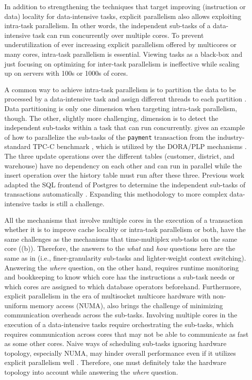 \documentclass[11pt]{article}
\begin{document}
In addition to strengthening the techniques that
target improving (instruction or data) locality for data-intensive tasks,
explicit parallelism also allows exploiting intra-task parallelism.
In other words, 
the independent sub-tasks of a data-intensive task can run concurrently over multiple cores.
To prevent underutilization of ever increasing explicit parallelism offered by multicores or many cores,
intra-task parallelism is essential.
Viewing tasks as a black-box and just focusing on optimizing for inter-task parallelism
is ineffective while scaling up on servers with 100s or 1000s of cores.

A common way to achieve intra-task parallelism is to partition the data to be processed
by a data-intensive task and assign different threads to each partition \cite{LeisBKN14, PsaroudakisSMSA15}.
Data partitioning is only one dimension when targeting intra-task parallelism, though.
The other, slightly more challenging, dimension is to detect the independent sub-tasks
within a task that can run concurrently. 
 gives an example of how to parallelize the sub-tasks of the
\texttt{payment} transaction from the industry-standard TPC-C benchmark \cite{TPCC},
which is utilized by the DORA/PLP mechanisms \cite{Pandis+11, PandisTJA11}.
The three update operations over the different tables (customer, district, and warehouse)
have no dependency on each other and can run in parallel
while the insert operation over the history table must run after these three.
Previous work adapted the SQL frontend of Postgres to determine the independent
sub-tasks of transactions automatically \cite{Pandis+11}.
Expanding this methodology to more complex data-intensive tasks is still a challenge.

All the mechanisms that involve multiple cores in the execution of a transaction
whether it is to improve cache locality or intra-task parallelism or both,
have the same challenges as the mechanisms that time-multiplex sub-tasks on the same core ((b)).
Therefore, the answers to the \textit{what} and \textit{how} questions here are the same as in 
(i.e., finer-granularity sub-tasks and lighter-weight context switching).
Answering the \textit{where} question, on the other hand,
requires runtime monitoring and bookkeeping to know which core has the instructions a sub-task needs
or which cores are assigned to which database operators beforehand.
Furthermore,
explicit parallelism in the era of multisocket multicore hardware with non-uniform memory access (NUMA),
also brings the challenge of minimizing communication overheads across the sub-tasks.
Involving multiple cores in the execution of a data-intensive tasks require orchestrating the sub-tasks,
which requires communication across cores that may not be able to communicate as fast as some other cores.
Naive ways of scheduling sub-tasks ignoring hardware topology, especially NUMA,
may hinder overall performance even if it utilizes explicit parallelism well \cite{PorobicLTA14, PsaroudakisSMSA15}.
Therefore, one must definitely take the hardware topology into account while answering the \textit{where} question.
\end{document}
